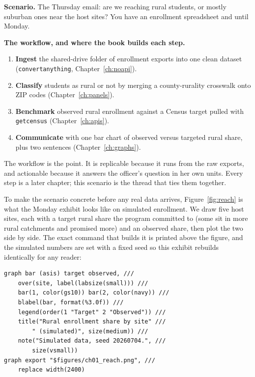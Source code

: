 \documentclass[
    a4paper,
    fontsize=10pt,
    twoside=true,
    numbers=noenddot,
]{kaobook}
\newcounter{appliedexample}
\newenvironment{appliedexample}[1][]{%
    \refstepcounter{appliedexample}%
    \begin{appliedexamplebox}[frametitle={Applied Example~\theappliedexample.~~#1}]%
}{%
    \end{appliedexamplebox}%
}
\begin{document}
\begin{appliedexample}[From a funder's question to a one-page answer]
\textbf{Scenario.} The Thursday email: are we reaching rural students, or mostly suburban ones near the host sites? You have an enrollment spreadsheet and until Monday.

\medskip
\textbf{The workflow, and where the book builds each step.}
\begin{enumerate}
    \item \textbf{Ingest} the shared-drive folder of enrollment exports into one clean dataset (\texttt{convertanything}, Chapter~\ref{ch:noapi}).
    \item \textbf{Classify} students as rural or not by merging a county-rurality crosswalk onto ZIP codes (Chapter~\ref{ch:panels}).
    \item \textbf{Benchmark} observed rural enrollment against a Census target pulled with \texttt{getcensus} (Chapter~\ref{ch:apis}).
    \item \textbf{Communicate} with one bar chart of observed versus targeted rural share, plus two sentences (Chapter~\ref{ch:graphs}).
\end{enumerate}
The workflow is the point. It is replicable because it runs from the raw exports, and actionable because it answers the officer's question in her own units. Every step is a later chapter; this scenario is the thread that ties them together.
\end{appliedexample}

To make the scenario concrete before any real data arrives, Figure~\ref{fig:reach} is what the Monday exhibit looks like on simulated enrollment. We draw five host sites, each with a target rural share the program committed to (some sit in more rural catchments and promised more) and an observed share, then plot the two side by side. The exact command that builds it is printed above the figure, and the simulated numbers are set with a fixed seed so this exhibit rebuilds identically for any reader:
{\footnotesize
\begin{verbatim}
graph bar (asis) target observed, ///
    over(site, label(labsize(small))) ///
    bar(1, color(gs10)) bar(2, color(navy)) ///
    blabel(bar, format(%3.0f)) ///
    legend(order(1 "Target" 2 "Observed")) ///
    title("Rural enrollment share by site" ///
        " (simulated)", size(medium)) ///
    note("Simulated data, seed 20260704.", ///
        size(vsmall))
graph export "$figures/ch01_reach.png", ///
    replace width(2400)
\end{verbatim}
}
\end{document}
